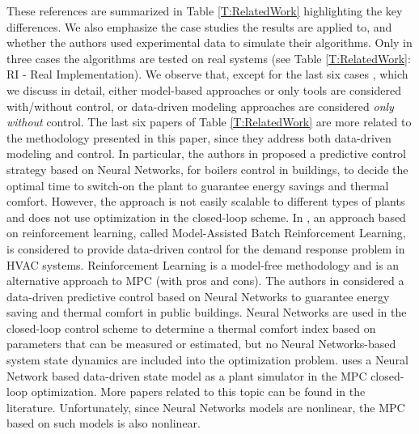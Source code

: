 \textcolor[rgb]{0,0,1}{
These references are summarized in Table \ref{T:RelatedWork} highlighting the key differences.
We also emphasize the case studies the results are applied to, and whether the authors used experimental data to simulate their algorithms.
Only in three cases the algorithms are tested on real systems (see Table \ref{T:RelatedWork}: RI - Real Implementation).
We observe that, except for the last six cases \cite{Macarulla2017,Costanzo2016,Ferreira2012,Afram2017,Behl2016,Jain2017TCPS}, which we discuss in detail, either model-based approaches or only tools are considered with/without control, or data-driven modeling approaches are considered \emph{only without} control.
The last six papers of Table \ref{T:RelatedWork} are more related to the methodology presented in this paper, since they address both data-driven modeling and control.
In particular, the authors in \cite{Macarulla2017} proposed a predictive control strategy based on Neural Networks, for boilers control in buildings, to decide the optimal time to switch-on the plant to guarantee energy savings and thermal comfort.
However, the approach is not easily scalable to different types of plants and does not use optimization in the closed-loop scheme.
In \cite{Costanzo2016}, an approach based on reinforcement learning, called Model-Assisted Batch Reinforcement Learning, is considered to provide data-driven control for the demand response problem in HVAC systems.
Reinforcement Learning is a model-free methodology and is an alternative approach to MPC \cite{Ernst2009TSMC} (with pros and cons).
The authors in \cite{Ferreira2012}considered a data-driven predictive control based on Neural Networks to guarantee energy saving and  thermal comfort in public buildings.
Neural Networks are used in the closed-loop control scheme to determine a thermal comfort index based on parameters that can be measured or estimated, but no Neural Networks-based system state dynamics are included into the optimization problem.
\cite{Afram2017} uses a Neural Network based data-driven state model as a plant simulator in the MPC closed-loop optimization.
More papers related to this topic can be found in the literature.
Unfortunately, since Neural Networks models are nonlinear, the MPC based on such models is also nonlinear.
}
